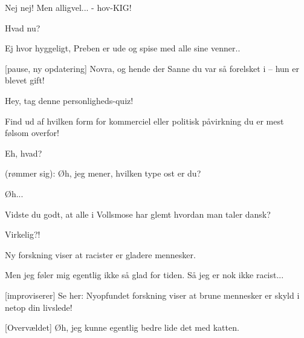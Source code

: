 \documentclass[a4paper,11pt]{article}
\begin{document}
\begin{sketch}
   Nej nej! Men alligvel... \-- hov-KIG!

   Hvad nu?

   Ej hvor hyggeligt, Preben er ude og spise med alle sine venner..


  [pause, ny opdatering] Novra, og hende der Sanne du var så forelsket i -- hun er blevet gift!



   Hey, tag denne personligheds-quiz!

   Find ud af hvilken form for kommerciel eller politisk påvirkning du er mest følsom overfor!


   Eh, hvad?

   (rømmer sig): Øh, jeg mener, hvilken type ost er du?


   Øh...

   Vidste du godt, at alle i Vollsmose har glemt hvordan man taler
  dansk?


   Virkelig?!

   Ny forskning viser at racister er gladere mennesker.


   Men jeg føler mig egentlig ikke så glad for tiden. Så jeg er nok ikke racist...

  [improviserer] Se her: Nyopfundet forskning viser at brune mennesker er skyld i netop din livslede!


  [Overvældet] Øh, jeg kunne egentlig bedre lide det med katten.


\end{sketch}
\end{document}
